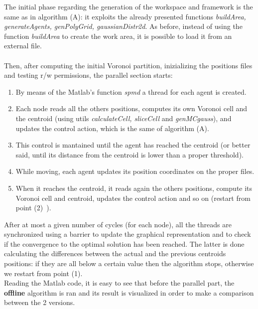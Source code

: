 \documentclass[a4paper,11pt,oneside]{book}
\begin{document}
The initial phase regarding the generation of the workspace and framework is the same as in algorithm (A): it exploits the already presented functions \textit{buildArea, generateAgents, genPolyGrid, gaussianDistr2d}. As before, instead of using the function \textit{buildArea} to create the work area, it is possible to load it from an external file.\\\\
Then, after computing the initial Voronoi partition, inizializing the positions files and testing r/w permissions, the parallel section starts:
\begin{enumerate}
	
	\item  By means of the Matlab's function \textit{spmd} a thread for each agent is created.
	
	\item Each node reads all the others positions, computes its own Voronoi cell and the centroid (using utils \textit{calculateCell, sliceCell} and \textit{genMCgauss}), and updates the control action, which is the same of algorithm (A).
	
	\item This control is mantained until the agent has reached the centroid (or better said, until its distance from the centroid is lower than a proper threshold).
	
	\item While moving, each agent updates its position coordinates on the proper files.
	
	\item When it reaches the centroid, it reads again the others positions, compute its Voronoi cell and centroid, updates the control action and so on (restart from point (2)\ ).
\end{enumerate} 
After at most a given number of cycles (for each node), all the threads are synchronized using a barrier to update the graphical representation and to check if the convergence to the optimal solution has been reached. The latter is done calculating the differences between the actual and the previous centroids positions: if they are all below a certain value then the algorithm stops, otherwise we restart from point (1).\\

Reading the Matlab code, it is easy to see that before the parallel part, the \textbf{offline} algorithm is ran and its result is visualized in order to make a comparison between the 2 versions.
\end{document}
